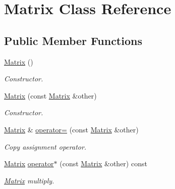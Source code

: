 \hypertarget{class_matrix}{}\section{Matrix Class Reference}
\label{class_matrix}
\subsection*{Public Member Functions}
\begin{DoxyCompactItemize}
\item 
\mbox{\label{class_matrix_a2dba13c45127354c9f75ef576f49269b}} 
\mbox{\hyperlink{class_matrix_a2dba13c45127354c9f75ef576f49269b}{Matrix}} ()
\begin{DoxyCompactList}\small\item\em Constructor. \end{DoxyCompactList}\item 
\mbox{\label{class_matrix_abcf708e864ed3d9db2c3b317c5e529ab}} 
\mbox{\hyperlink{class_matrix_abcf708e864ed3d9db2c3b317c5e529ab}{Matrix}} (const \mbox{\hyperlink{class_matrix}{Matrix}} \&other)
\begin{DoxyCompactList}\small\item\em Constructor. \end{DoxyCompactList}\item 
\mbox{\label{class_matrix_a5ec00f103780ba11e2f86f4d1dbf702c}} 
\mbox{\hyperlink{class_matrix}{Matrix}} \& \mbox{\hyperlink{class_matrix_a5ec00f103780ba11e2f86f4d1dbf702c}{operator=}} (const \mbox{\hyperlink{class_matrix}{Matrix}} \&other)
\begin{DoxyCompactList}\small\item\em Copy assignment operator. \end{DoxyCompactList}\item 
\mbox{\label{class_matrix_ab4f8e22e8db0983d75e090542f4d1f7a}} 
\mbox{\hyperlink{class_matrix}{Matrix}} \mbox{\hyperlink{class_matrix_ab4f8e22e8db0983d75e090542f4d1f7a}{operator$\ast$}} (const \mbox{\hyperlink{class_matrix}{Matrix}} \&other) const
\begin{DoxyCompactList}\small\item\em \mbox{\hyperlink{class_matrix}{Matrix}} multiply. \end{DoxyCompactList}\item 

\end{DoxyCompactItemize}
